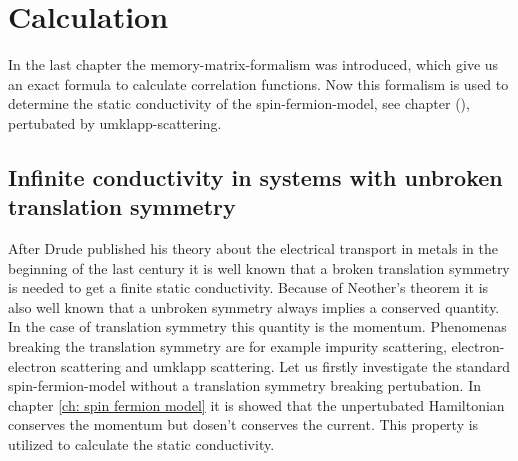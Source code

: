 \chapter{Calculation}
\label{ch: calculation}

In the last chapter the memory-matrix-formalism was introduced, which give us an exact formula to calculate correlation functions.
Now this formalism is used to determine the static conductivity of the spin-fermion-model, see chapter (), pertubated by umklapp-scattering.


\section{Infinite conductivity in systems with unbroken translation symmetry}
\label{sec: Infinite conductivity in a system with unbroken translation symmetry}
%
%
After Drude published his theory about the electrical transport in metals \cite{Drude} in the beginning of the last century it is well known that a broken translation symmetry is needed to get a finite static conductivity.
Because of Neother's theorem it is also well known that a unbroken symmetry always implies a conserved quantity.
In the case of translation symmetry this quantity is the momentum.
Phenomenas breaking the translation symmetry are for example impurity scattering, electron-electron scattering and umklapp scattering.
Let us firstly investigate the standard spin-fermion-model without a translation symmetry breaking pertubation.
In chapter \ref{ch: spin fermion model} it is showed that the unpertubated Hamiltonian conserves the momentum but dosen't conserves the current.
This property is utilized to calculate the static conductivity.

